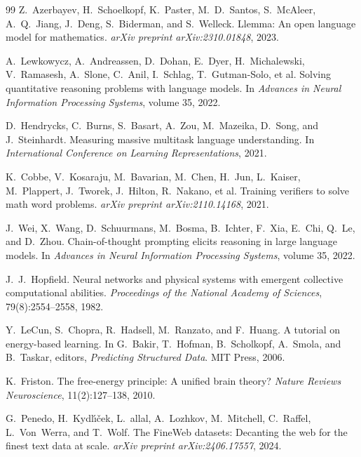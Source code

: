 \documentclass[10pt,a4paper]{article}
\begin{document}
\begin{thebibliography}{99}
Z.~Azerbayev, H.~Schoelkopf, K.~Paster, M.~D.~Santos, S.~McAleer, A.~Q.~Jiang, J.~Deng, S.~Biderman, and S.~Welleck.
\newblock Llemma: An open language model for mathematics.
\newblock \textit{arXiv preprint arXiv:2310.01848}, 2023.

A.~Lewkowycz, A.~Andreassen, D.~Dohan, E.~Dyer, H.~Michalewski, V.~Ramasesh, A.~Slone, C.~Anil, I.~Schlag, T.~Gutman-Solo, et al.
\newblock Solving quantitative reasoning problems with language models.
\newblock In \textit{Advances in Neural Information Processing Systems}, volume 35, 2022.

D.~Hendrycks, C.~Burns, S.~Basart, A.~Zou, M.~Mazeika, D.~Song, and J.~Steinhardt.
\newblock Measuring massive multitask language understanding.
\newblock In \textit{International Conference on Learning Representations}, 2021.

K.~Cobbe, V.~Kosaraju, M.~Bavarian, M.~Chen, H.~Jun, L.~Kaiser, M.~Plappert, J.~Tworek, J.~Hilton, R.~Nakano, et al.
\newblock Training verifiers to solve math word problems.
\newblock \textit{arXiv preprint arXiv:2110.14168}, 2021.

J.~Wei, X.~Wang, D.~Schuurmans, M.~Bosma, B.~Ichter, F.~Xia, E.~Chi, Q.~Le, and D.~Zhou.
\newblock Chain-of-thought prompting elicits reasoning in large language models.
\newblock In \textit{Advances in Neural Information Processing Systems}, volume 35, 2022.

J.~J.~Hopfield.
\newblock Neural networks and physical systems with emergent collective computational abilities.
\newblock \textit{Proceedings of the National Academy of Sciences}, 79(8):2554--2558, 1982.

Y.~LeCun, S.~Chopra, R.~Hadsell, M.~Ranzato, and F.~Huang.
\newblock A tutorial on energy-based learning.
\newblock In G.~Bakir, T.~Hofman, B.~Scholkopf, A.~Smola, and B.~Taskar, editors, \textit{Predicting Structured Data}. MIT Press, 2006.

K.~Friston.
\newblock The free-energy principle: A unified brain theory?
\newblock \textit{Nature Reviews Neuroscience}, 11(2):127--138, 2010.

G.~Penedo, H.~Kydl{\'\i}{\v{c}}ek, L.~allal, A.~Lozhkov, M.~Mitchell, C.~Raffel, L.~Von~Werra, and T.~Wolf.
\newblock The {FineWeb} datasets: Decanting the web for the finest text data at scale.
\newblock \textit{arXiv preprint arXiv:2406.17557}, 2024.


\end{thebibliography}
\end{document}

